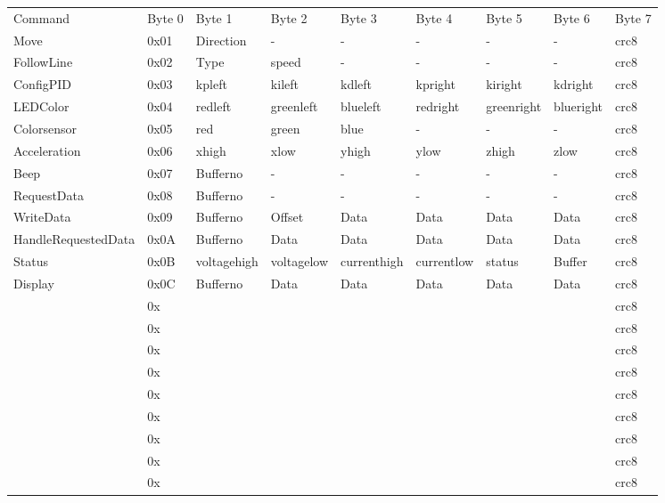 \documentclass[a4paper]{article}
\begin{document}
\begin{landscape}
\begin{tabular}{lllllllll}
Command &
    Byte 0 &
    Byte 1 &
    Byte 2 &
    Byte 3 &
    Byte 4 &
    Byte 5 &
    Byte 6 &
    Byte 7 \\
Move &
    0x01 &
    Direction &
    - &
    - &
    - &
    - &
    - &
    crc8 \\
FollowLine &
    0x02 &
    Type &
    speed &
    - &
    - &
    - &
    - &
    crc8 \\
ConfigPID &
    0x03 &
    kpleft &
    kileft &
    kdleft &
    kpright &
    kiright &
    kdright &
    crc8 \\
LEDColor &
    0x04 &
    redleft &
    greenleft &
    blueleft &
    redright &
    greenright &
    blueright &
    crc8 \\
Colorsensor &
    0x05 &
    red &
    green &
    blue &
    - &
    - &
    - &
    crc8 \\
Acceleration &
    0x06 &
    xhigh &
    xlow &
    yhigh &
    ylow &
    zhigh &
    zlow &
    crc8 \\
Beep &
    0x07 &
    Bufferno &
    - &
    - &
    - &
    - &
    - &
    crc8 \\
RequestData &
    0x08 &
    Bufferno &
    - &
    - &
    - &
    - &
    - &
    crc8 \\
WriteData &
    0x09 &
    Bufferno &
    Offset &
    Data &
    Data &
    Data &
    Data &
    crc8 \\
HandleRequestedData &
    0x0A &
    Bufferno &
    Data &
    Data &
    Data &
    Data &
    Data &
    crc8 \\
Status &
    0x0B &
    voltagehigh &
    voltagelow &
    currenthigh &
    currentlow &
    status &
    Buffer &
    crc8 \\
Display &
    0x0C &
    Bufferno &
    Data &
    Data &
    Data &
    Data &
    Data &
    crc8 \\
 &
    0x &
     &
     &
     &
     &
     &
     &
    crc8 \\
 &
    0x &
     &
     &
     &
     &
     &
     &
    crc8 \\
 &
    0x &
     &
     &
     &
     &
     &
     &
    crc8 \\
 &
    0x &
     &
     &
     &
     &
     &
     &
    crc8 \\
 &
    0x &
     &
     &
     &
     &
     &
     &
    crc8 \\
 &
    0x &
     &
     &
     &
     &
     &
     &
    crc8 \\
 &
    0x &
     &
     &
     &
     &
     &
     &
    crc8 \\
 &
    0x &
     &
     &
     &
     &
     &
     &
    crc8 \\
 &
    0x &
     &
     &
     &
     &
     &
     &
    crc8 \\

\end{tabular}
\end{landscape}
\end{document}
